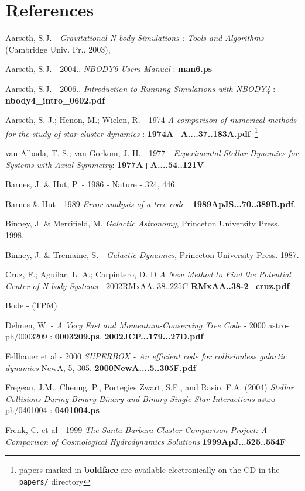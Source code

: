 \chapter                {References}


Aarseth, S.J. - 
{\it Gravitational N-body Simulations : Tools and Algorithms} 
(Cambridge Univ. Pr., 2003),

Aarseth, S.J. - 2004.. {\it NBODY6 Users Manual} : {\bf man6.ps}

Aarseth, S.J. - 2006.. {\it Introduction to Running Simulations with NBODY4} : 
{\bf nbody4\_intro\_0602.pdf}


Aarseth, S. J.; Henon, M.; Wielen, R. - 1974
{\it A comparison of numerical methods for the study of star cluster 
dynamics} : {\bf 1974A+A....37..183A.pdf}~\footnote{papers marked 
in {\bf boldface} are available electronically on the CD in the {\tt papers/} directory}

van Albada, T. S.; van Gorkom, J. H.	- 1977 -
{\it Experimental Stellar Dynamics for Systems with Axial Symmetry}:
{\bf 1977A+A....54..121V}



Barnes, J. \& Hut, P. - 1986 - Nature - 324, 446.

Barnes \& Hut - 1989
{\it Error analysis of a tree code} - {\bf 1989ApJS...70..389B.pdf}.

Binney, J. \& Merrifield, M. {\it Galactic Astronomy}, Princeton University Press. 1998.

Binney, J. \& Tremaine, S. - {\it Galactic Dynamics}, Princeton University Press. 1987. 

Cruz, F.; Aguilar, L. A.; Carpintero, D. D
{\it A New Method to Find the Potential Center of N-body Systems} - 2002RMxAA..38..225C
{\bf RMxAA..38-2\_cruz.pdf}

Bode - (TPM)

Dehnen, W. - {\it A Very Fast and Momentum-Conserving Tree Code} - 2000
astro-ph/0003209 : {\bf 0003209.ps}, {\bf 2002JCP...179...27D.pdf}

Fellhauer et al - 2000 
{\it SUPERBOX - An efficient code for collisionless galactic dynamics}
NewA, 5, 305. {\bf 2000NewA....5..305F.pdf} 

Fregeau, J.M., Cheung, P., Portegies Zwart, S.F., and Rasio, F.A. (2004)
{\it Stellar Collisions During Binary-Binary and Binary-Single Star Interactions}
astro-ph/0401004 : {\bf 0401004.ps}

Frenk, C. et al - 1999 
{\it The Santa Barbara Cluster Comparison Project: A Comparison of Cosmological Hydrodynamics Solutions}
{\bf 1999ApJ...525..554F}

